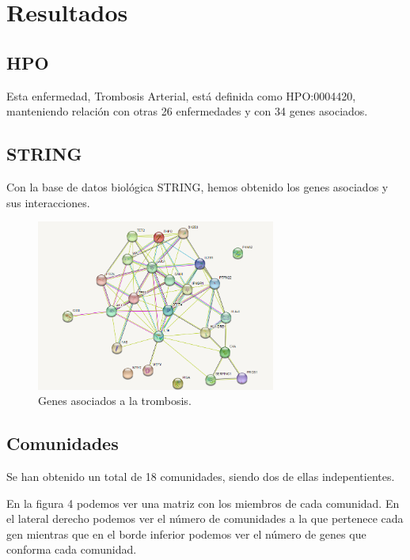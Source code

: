  \newpage
 \section{Resultados}
 
 \subsection{HPO}
 Esta enfermedad, Trombosis Arterial, está definida como HPO:0004420, manteniendo relación con otras 26 enfermedades y con 34 genes asociados.
 
 \subsection{STRING}
 Con la base de datos biológica STRING, hemos obtenido los genes asociados y sus interacciones.
\begin{figure}[h]
	\centering
	\includegraphics[width=0.70\textwidth]{figures/genes_asociados.png}
	\caption{Genes asociados a la trombosis.}
	\label{fig: Figura 3}
\end{figure}


\subsection{Comunidades}
Se han obtenido un total de 18 comunidades, siendo dos de ellas indepentientes.

En la figura 4 podemos ver una matriz con los miembros de cada comunidad. En el lateral derecho podemos ver el número de comunidades a la que pertenece cada gen mientras que en el borde inferior podemos ver el número de genes que conforma cada comunidad. 

